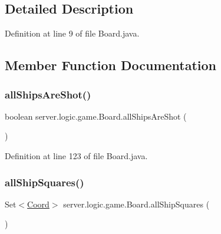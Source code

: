 \subsection{Detailed Description}


Definition at line 9 of file Board.\+java.



\subsection{Member Function Documentation}
\hypertarget{classserver_1_1logic_1_1game_1_1_board_a1494f4cde8adcae437b6bbec8480c7cf}{}\label{classserver_1_1logic_1_1game_1_1_board_a1494f4cde8adcae437b6bbec8480c7cf} 
\subsubsection{\texorpdfstring{all\+Ships\+Are\+Shot()}{allShipsAreShot()}}
{\footnotesize\ttfamily boolean server.\+logic.\+game.\+Board.\+all\+Ships\+Are\+Shot (\begin{DoxyParamCaption}{ }\end{DoxyParamCaption})}



Definition at line 123 of file Board.\+java.

\hypertarget{classserver_1_1logic_1_1game_1_1_board_ab83f640a1a737762190a65d7486b86dc}{}\label{classserver_1_1logic_1_1game_1_1_board_ab83f640a1a737762190a65d7486b86dc} 
\subsubsection{\texorpdfstring{all\+Ship\+Squares()}{allShipSquares()}}
{\footnotesize\ttfamily Set$<$\hyperlink{classsharedlib_1_1utils_1_1_coord}{Coord}$>$ server.\+logic.\+game.\+Board.\+all\+Ship\+Squares (\begin{DoxyParamCaption}{ }\end{DoxyParamCaption})}



